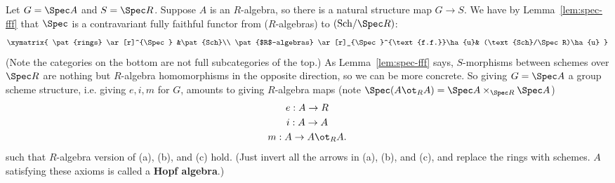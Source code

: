 Let $G=\Spec A$ and $S=\Spec R$. Suppose $A$ is an $R$-algebra, so there is a natural structure map $G\to S$. We have by Lemma~\ref{lem:spec-fff} that $\Spec$ is a contravariant fully faithful functor from ($R$-algebras) to $(\text{Sch}/\Spec R)$:
\[
\xymatrix{
\pat{rings} \ar[r]^{\Spec} &\pat{Sch}\\
\pat{$R$-algebras}  \ar[r]_{\Spec}^{\text{f.f.}}\ha{u}& (\text{Sch}/\Spec R)\ha{u}
}
\]
(Note the categories on the bottom are not full subcategories of the top.)
As Lemma~\ref{lem:spec-fff} says,
$S$-morphisms between schemes over $\Spec R$ are nothing but $R$-algebra homomorphisms in the opposite direction, so we can be more concrete. So giving $G=\Spec A$ a group scheme structure, i.e. giving $e,i,m$ for $G$, amounts to giving $R$-algebra maps (note $\Spec(A\ot_R A)=\Spec A \times_{\Spec R}\Spec A$)
\begin{gather*}
e:A\to R\\
i:A\to A\\
m:A\to A\ot_R A.
\end{gather*}
such that $R$-algebra version of (a), (b), and (c) hold. (Just invert all the arrows in (a), (b), and (c), and replace the rings with schemes. $A$ satisfying these axioms is called a \textbf{Hopf algebra}.)

